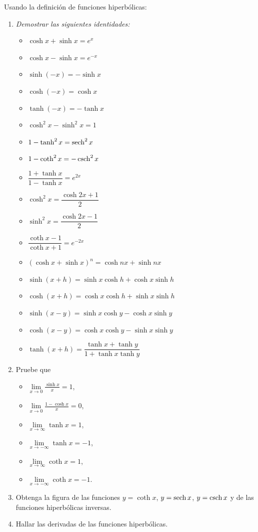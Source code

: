 \begin{ejer} Usando la definición de funciones hiperbólicas:
  \begin{enumerate}
    \item \textit{Demostrar las siguientes identidades:}
      \begin{itemize}
        \item   $\cosh x+\sinh x=e^{x}$
        \item  $\cosh x-\sinh x=e^{-x}$
        \item  $\sinh (-x)=-\sinh x$
        \item   $\cosh (-x)=\cosh x$
        \item   $\tanh (-x)=-\tanh x$
        \item  $\cosh ^{2}x-\sinh ^{2}x=1$
        \item  $1-\tanh ^{2}x=\sech^{2}x$
        \item  $1-\coth ^{2}x=-\csch^{2}x$

        \item   $\dfrac{1+\tanh x}{1-\tanh x}=e^{2x}$
        \item  $\cosh ^{2}x=\dfrac{\cosh 2x+1}{2}$
        \item  $\sinh ^{2}x=\dfrac{\cosh 2x-1}{2}$
        \item  $\dfrac{\coth x-1}{\coth x+1}=e^{-2x}$
        \item   $(\cosh x+\sinh x)^{n}=\cosh nx+\sinh nx$
        \item   $\sinh (x+h)=\sinh x\cosh h+\cosh x\sinh h$
        \item   $\cosh (x+h)=\cosh x\cosh h+\sinh x\sinh h$
        \item $\sinh (x-y)= \sinh x\cosh y-\cosh x\sinh y$
        \item $\cosh (x-y)= \cosh x\cosh y-\sinh x\sinh y$
        \item   $\tanh (x+h)=\dfrac{\tanh x+\tanh y}{1+\tanh x\tanh y}$
      \end{itemize}
    \item Pruebe que

      \begin{itemize}
        \item $\lim\limits_{x\rightarrow 0}\frac{\sinh x}{x}=1$,
        \item  $\lim\limits_{x\rightarrow 0}\frac{1-\cosh x}{x}=0$,
        \item $\lim\limits_{x\rightarrow \infty }\tanh x= 1$,
        \item  $\lim\limits_{x\rightarrow -\infty }\tanh x= -1$,
        \item $\lim\limits_{x\rightarrow \infty }\coth x= 1$,
        \item  $\lim\limits_{x\rightarrow -\infty }\coth x= -1$.
      \end{itemize}

    \item Obtenga la figura de las funciones $y=\coth x$, $y=\sech x$, $y=\csch x$ y de las funciones
      hiperbólicas inversas.

    \item Hallar las derivadas de las funciones hiperbólicas.
  \end{enumerate}
\end{ejer}

